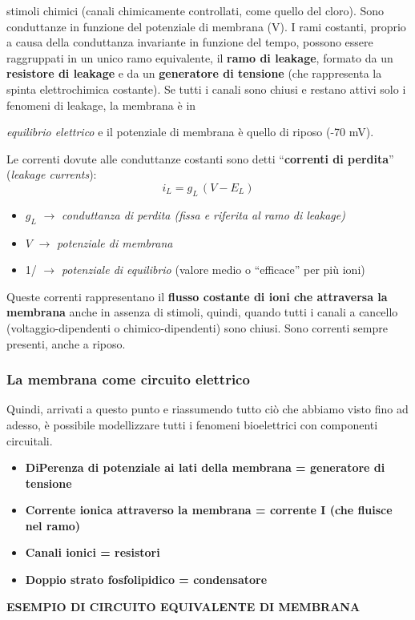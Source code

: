 stimoli chimici (canali chimicamente controllati, come quello del cloro). Sono conduttanze in funzione del potenziale di membrana (V).
I rami costanti, proprio a causa della conduttanza invariante in funzione del tempo, possono essere raggruppati in un unico ramo equivalente, il \textbf{ramo di leakage}, formato da un \textbf{resistore di leakage }e da un \textbf{generatore di tensione }(che rappresenta la spinta elettrochimica costante).
Se tutti i canali sono chiusi e restano attivi solo i fenomeni di leakage, la membrana è in

\textit{equilibrio elettrico }e il potenziale di membrana è quello di riposo (-70 mV).

Le correnti dovute alle conduttanze costanti sono detti ``\textbf{correnti di perdita}'' (\textit{leakage currents}):
\[
  i_L = g_L\,(V - E_L)
\]
\begin{itemize}
  \item $g_L$ $\rightarrow$ \textit{conduttanza di perdita (fissa e riferita al ramo di leakage)}
  \item $V$ $\rightarrow$ \textit{potenziale di membrana}
  \item 1/ $\rightarrow$ \textit{potenziale di equilibrio }(valore medio o ``efficace'' per più ioni)
\end{itemize}
Queste correnti rappresentano il \textbf{flusso costante di ioni che attraversa la membrana }anche in assenza di stimoli, quindi, quando tutti i canali a cancello (voltaggio-dipendenti o chimico-dipendenti) sono chiusi. Sono correnti sempre presenti, anche a riposo.

\subsubsection{La membrana come circuito elettrico}

Quindi, arrivati a questo punto e riassumendo tutto ciò che abbiamo visto fino ad adesso, è possibile modellizzare tutti i fenomeni bioelettrici con componenti circuitali.

\begin{itemize}
  \item \textbf{DiPerenza di potenziale ai lati della membrana = generatore di tensione}
  \item \textbf{Corrente ionica attraverso la membrana = corrente I (che fluisce nel ramo)}
  \item \textbf{Canali ionici = resistori}
  \item \textbf{Doppio strato fosfolipidico = condensatore}
\end{itemize}
\textbf{ESEMPIO DI CIRCUITO EQUIVALENTE DI MEMBRANA}

